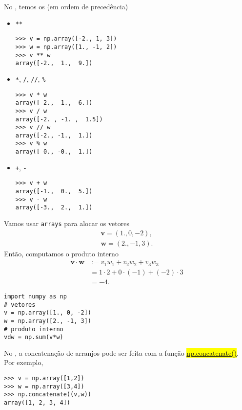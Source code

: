 No {\numpy}, temos os  (em ordem de precedência)
\begin{itemize}
\item \lstinline!**!
\begin{lstlisting}
>>> v = np.array([-2., 1, 3])
>>> w = np.array([1., -1, 2])
>>> v ** w
array([-2.,  1.,  9.])
\end{lstlisting}

\item \lstinline!*!, \lstinline!/!, \lstinline!//!, \lstinline!%!
\begin{lstlisting}
>>> v * w
array([-2., -1.,  6.])
>>> v / w
array([-2. , -1. ,  1.5])
>>> v // w
array([-2., -1.,  1.])
>>> v % w
array([ 0., -0.,  1.])
\end{lstlisting}
\item \lstinline!+!, \lstinline!-!
\begin{lstlisting}
>>> v + w
array([-1.,  0.,  5.])
>>> v - w
array([-3.,  2.,  1.])
\end{lstlisting}
\end{itemize}

\begin{ex}
  Vamos usar \lstinline+arrays+ para alocar os vetores
  \begin{align}
    \pmb{v} = (1., 0, -2),\\
    \pmb{w} = (2., -1, 3).
  \end{align}
  Então, computamos o produto interno
  \begin{subequations}
    \begin{align}
      \pmb{v}\cdot\pmb{w} &:= v_1w_1 + v_2w_2 + v_3w_3\\
                          &= 1\cdot 2 + 0\cdot(-1) + (-2)\cdot 3\\
                          &= -4.
    \end{align}
  \end{subequations}
\begin{lstlisting}
import numpy as np
# vetores
v = np.array([1., 0, -2])
w = np.array([2., -1, 3])
# produto interno
vdw = np.sum(v*w)
\end{lstlisting}
\end{ex}

\begin{obs}
  No {\numpy}, a concatenação de arranjos pode ser feita com a função \hl{{\href{https://numpy.org/doc/stable/reference/generated/numpy.concatenate.html}{np.concatenate()}}}. Por exemplo,
\begin{lstlisting}
>>> v = np.array([1,2])
>>> w = np.array([3,4])
>>> np.concatenate((v,w))
array([1, 2, 3, 4])
\end{lstlisting}
\end{obs}

